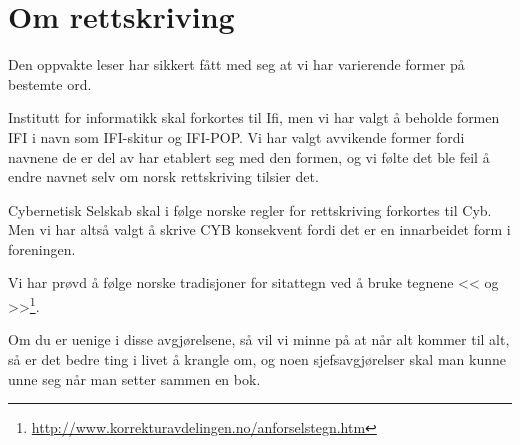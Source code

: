 \chapter*{Om rettskriving}

\setcounter{footnote}{0}

Den oppvakte leser har sikkert fått med seg at vi har varierende former på bestemte ord.

Institutt for informatikk skal forkortes til Ifi, men vi har valgt å beholde formen IFI i navn som IFI-skitur og IFI-POP. Vi har valgt avvikende former fordi navnene de er del av har etablert seg med den formen, og vi følte det ble feil å endre navnet selv om norsk rettskriving tilsier det. 

Cybernetisk Selskab skal i følge norske regler for rettskriving forkortes til Cyb. Men vi har altså valgt å skrive CYB konsekvent fordi det er en innarbeidet form i foreningen.

Vi har prøvd å følge norske tradisjoner for sitattegn ved å bruke tegnene << og >>\footnote{\url{http://www.korrekturavdelingen.no/anforselstegn.htm}}.

Om du er uenige i disse avgjørelsene, så vil vi minne på at når alt kommer til alt, så er det bedre ting i livet å krangle om, og noen sjefsavgjørelser skal man kunne unne seg når man setter sammen en bok.
